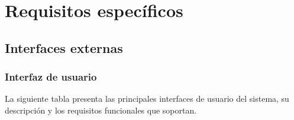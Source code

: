 \documentclass[11pt,a4paper]{article}
\begin{document}
\section{Requisitos específicos}

\subsection{Interfaces externas}

\subsubsection{Interfaz de usuario}
La siguiente tabla presenta las principales interfaces de usuario del sistema, su descripción y los requisitos funcionales que soportan.
\end{document}
